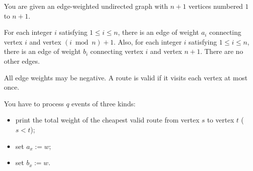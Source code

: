 You are given an edge-weighted undirected graph with $n + 1$ vertices numbered $1$ to $n + 1$.

For each integer $i$ satisfying $1 \le i \le n$, there is an edge of weight $a_i$ connecting vertex $i$ and vertex $(i \bmod n) + 1$. Also, for each integer $i$ satisfying $1 \le i \le n$, there is an edge of weight $b_i$ connecting vertex $i$ and vertex $n + 1$. There are no other edges.

All edge weights may be negative. A route is valid if it visits each vertex at most once.

You have to process $q$ events of three kinds:

\begin{itemize}
\item print the total weight of the cheapest valid route from vertex $s$ to vertex $t$ ($s < t$);
\item set $a_x := w$;
\item set $b_x := w$.
\end{itemize}
